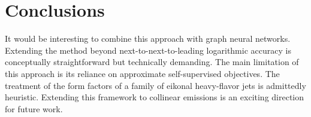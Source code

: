 \section{Conclusions}\label{sec:conclusions}

It would be interesting to combine this approach with graph neural
networks. Extending the method beyond next-to-next-to-leading
logarithmic accuracy is conceptually straightforward but technically
demanding. The main limitation of this approach is its reliance on
approximate self-supervised objectives. The treatment of the form
factors of a family of eikonal heavy-flavor jets is admittedly
heuristic. Extending this framework to collinear emissions is an
exciting direction for future work.

